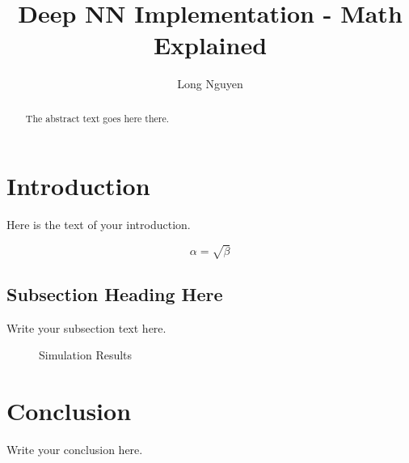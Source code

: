 \documentclass{article}
\begin{document}
	
	\title{Deep NN Implementation - Math Explained}
	\author{Long Nguyen}
	
	\maketitle
	
	\begin{abstract}
		The abstract text goes here there.
	\end{abstract}
	
	\section{Introduction}
	Here is the text of your introduction.
	
	\begin{equation}
		\label{simple_equation}
		\alpha = \sqrt{ \beta }
	\end{equation}
	
	\subsection{Subsection Heading Here}
	Write your subsection text here.
	
	\begin{figure}
		\centering
		\caption{Simulation Results}
		\label{simulationfigure}
	\end{figure}
	
	\section{Conclusion}
	Write your conclusion here.
	
\end{document}
